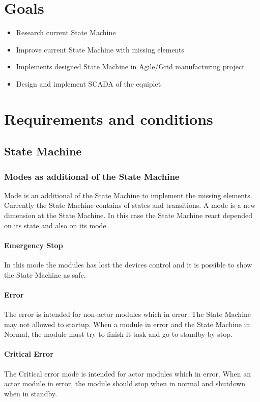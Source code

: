 \documentclass[12pt,a4paper]{report}
\begin{document}
\section{Goals}
\begin{itemize}
\item Research current State Machine
\item Improve current State Machine with missing elements
\item Implements designed State Machine in Agile/Grid manufacturing project 
\item Design and implement SCADA of the equiplet
\end{itemize}

\newpage
\section{Requirements and conditions}

\subsection{State Machine}
\subsubsection{Modes as additional of the State Machine}
Mode is an additional of the State Machine to implement the missing elements.
Currently the State Machine contains of states and transitions. A mode is a new dimension at the State Machine. In this case the State Machine react depended on its state and also on its mode.
\paragraph{Emergency Stop}In this mode the modules has lost the devices control and it is possible to show the State Machine as safe.
\paragraph{Error}The error is intended for non-actor modules which in error. The State Machine may not allowed to startup. When a module in error and the State Machine in Normal, the module must try to finish it task and go to standby by stop.
\paragraph{Critical Error}The Critical error mode is intended for actor modules which in error. When an actor module in error, the module should stop when in normal and shutdown when in standby.
\end{document}
